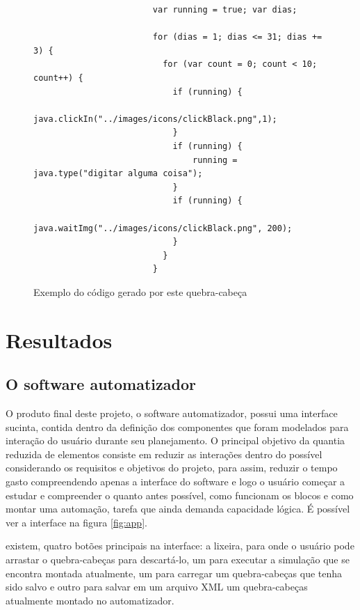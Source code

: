 \documentclass[tg]{mdtufsm}
\begin{document}
                    \begin{figure}[!htb]
                    \begin{lstlisting}
                        var running = true; var dias;

                        for (dias = 1; dias <= 31; dias += 3) {
                          for (var count = 0; count < 10; count++) {
                            if (running) {
                            java.clickIn("../images/icons/clickBlack.png",1);
                            }
                            if (running) {
                                running = java.type("digitar alguma coisa");
                            }
                            if (running) {
                                java.waitImg("../images/icons/clickBlack.png", 200);
                            }
                          }
                        }
                    \end{lstlisting}
                        \caption{Exemplo do código gerado por este quebra-cabeça}
                        \label{code:blocosecodigo.js}
                    \end{figure}

        \chapter {Resultados}

            \section {O software automatizador}

                O produto final deste projeto, o software automatizador, possui uma interface sucinta, contida dentro da definição dos componentes que foram modelados para interação do usuário durante seu planejamento. O principal objetivo da quantia reduzida de elementos consiste em reduzir as interações dentro do possível considerando os requisitos e objetivos do projeto, para assim, reduzir o tempo gasto compreendendo apenas a interface do software e logo o usuário começar a estudar e compreender o quanto antes possível, como funcionam os blocos e como montar uma automação, tarefa que ainda demanda capacidade lógica. É possível ver a interface na figura \ref{fig:app}.

                existem, quatro botões principais na interface: a lixeira, para onde o usuário pode arrastar o quebra-cabeças para descartá-lo, um para executar a simulação que se encontra montada atualmente, um para carregar um quebra-cabeças que tenha sido salvo e outro para salvar em um arquivo XML um quebra-cabeças atualmente montado no automatizador.
\end{document}
